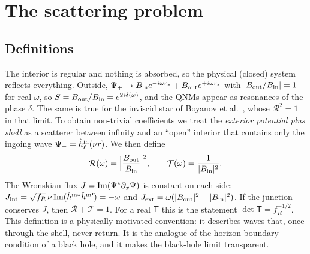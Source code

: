 \documentclass[11pt,a4paper]{article}
\numberwithin{equation}{section}
\newcommand{\sq}{\sqrt{f_R}}
\newcommand{\RR}{\mathcal R}
\newcommand{\TT}{\mathcal T}
\begin{document}
\section{The scattering problem}\label{sec:scatt}
\subsection{Definitions}
The interior is regular and nothing is absorbed, so the physical (closed) system reflects everything. Outside,
$\Psi_+\to B_{\rm in}e^{-i\omega r_*}+B_{\rm out}e^{+i\omega r_*}$ with $|B_{\rm out}/B_{\rm in}|=1$ for real $\omega$,
so $S=B_{\rm out}/B_{\rm in}=e^{2i\delta(\omega)}$, and the QNMs appear as resonances of the phase $\delta$. The same is
true for the inviscid star of Boyanov et al.\ \cite{Boyanov25}, whose $\RR^2=1$ in that limit. To obtain non-trivial
coefficients we treat the \emph{exterior potential plus shell} as a scatterer between infinity and an ``open''
interior that contains only the ingoing wave $\Psi_-=\hat h^{\rm in}_\ell(\nu r)$. We then define
\begin{equation}
\RR(\omega)=\Big|\frac{B_{\rm out}}{B_{\rm in}}\Big|^2,\qquad \TT(\omega)=\frac1{|B_{\rm in}|^2}.
\label{eq:RT}
\end{equation}
The Wronskian flux $J={\rm Im}(\Psi^*\partial_x\Psi)$ is constant on each side: $J_{\rm int}=\sq\,\nu\,{\rm Im}(\hat h^{\rm in*}\hat h^{\rm in\prime})=-\omega$
and $J_{\rm ext}=\omega(|B_{\rm out}|^2-|B_{\rm in}|^2)$. If the junction conserves $J$, then $\RR+\TT=1$. For a real
$\mathsf T$ this is the statement $\det\mathsf T=f_R^{-1/2}$. This definition is a physically motivated convention:
it describes waves that, once through the shell, never return. It is the analogue of the horizon boundary condition
of a black hole, and it makes the black-hole limit transparent.
\end{document}
